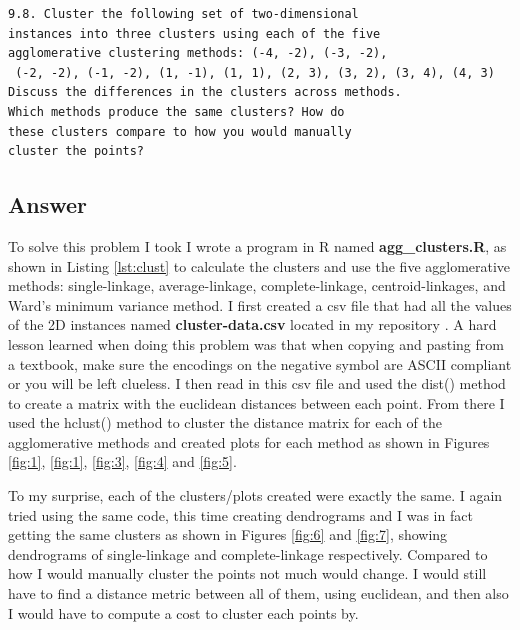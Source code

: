 \documentclass[letterpaper,11pt]{article}
\newcommand*{\srcPath}{../src}%
\begin{document}
\begin{verbatim}
9.8. Cluster the following set of two-dimensional 
instances into three clusters using each of the five 
agglomerative clustering methods: (-4, -2), (-3, -2),
 (-2, -2), (-1, -2), (1, -1), (1, 1), (2, 3), (3, 2), (3, 4), (4, 3)
Discuss the differences in the clusters across methods. 
Which methods produce the same clusters? How do 
these clusters compare to how you would manually
cluster the points?
\end{verbatim}

\subsection*{Answer}

To solve this problem I took I wrote a program in R named \textbf{agg\_clusters.R}, as shown in Listing \ref{lst:clust} to calculate the clusters and use the five agglomerative methods: single-linkage, average-linkage, complete-linkage, centroid-linkages, and Ward's minimum variance method.
I first created a csv file that had all the values of the 2D instances named \textbf{cluster-data.csv} located in my repository \cite{github}.
A hard lesson learned when doing this problem was that when copying and pasting from a textbook, make sure the encodings on the negative symbol are ASCII compliant or you will be left clueless.
I then read in this csv file and used the dist() method to create a matrix with the euclidean distances between each point.
From there I used the hclust() method to cluster the distance matrix for each of the agglomerative methods and created plots for each method as shown in Figures \ref{fig:1}, \ref{fig:1}, \ref{fig:3}, \ref{fig:4} and \ref{fig:5}.

To my surprise, each of the clusters/plots created were exactly the same.
I again tried using the same code, this time creating dendrograms and I was in fact getting the same clusters as shown in Figures \ref{fig:6} and \ref{fig:7}, showing dendrograms of single-linkage and complete-linkage respectively.
Compared to how I would manually cluster the points not much would change.
I would still have to find a distance metric between all of them, using euclidean, and then also I would have to compute a cost to cluster each points by.

 
\end{document}

